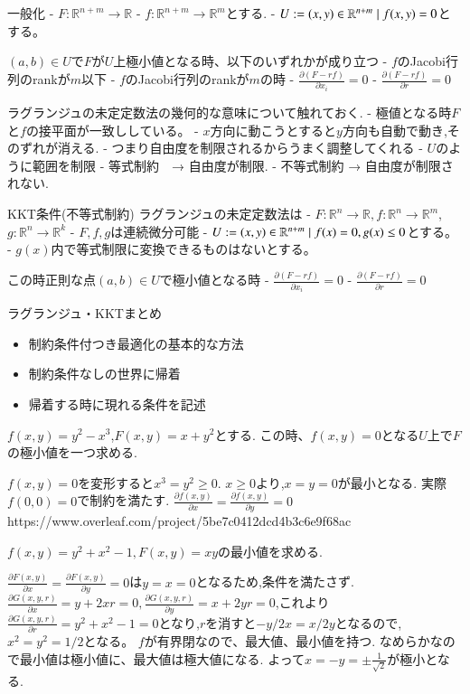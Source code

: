 一般化
- $F: \mathbb{R}^{n+m} \to \mathbb{R}$
- $f: \mathbb{R}^{n+m} \to \mathbb{R}^m$とする.
- $U := \\{ (x,y) \in \mathbb{R}^{n+m} \mid f(x,y) = 0\\}$とする。

$(a, b) \in U$で$F$が$U$上極小値となる時、以下のいずれかが成り立つ
- $f$のJacobi行列のrankが$m$以下
- $f$のJacobi行列のrankが$m$の時
  - $\frac{ \partial (F - r f)}{\partial x_i} = 0$
  - $\frac{ \partial (F - r f)}{\partial r} = 0$

ラグランジュの未定定数法の幾何的な意味について触れておく.
- 極値となる時$F$と$f$の接平面が一致ししている。
- $x$方向に動こうとすると$y$方向も自動で動き,そのずれが消える.
- つまり自由度を制限されるからうまく調整してくれる
- $U$のように範囲を制限
  - 等式制約　→ 自由度が制限.
  - 不等式制約 → 自由度が制限されない.

KKT条件(不等式制約)
ラグランジュの未定定数法は
- $F: \mathbb{R}^{n} \to \mathbb{R}, f: \mathbb{R}^{n} \to \mathbb{R}^m$, $g: \mathbb{R}^{n} \to \mathbb{R}^k$
- $F,f, g$は連続微分可能
- $U := \\{(x,y) \in \mathbb{R}^{n+m} \mid f(x) = 0, g(x) \le 0\\}$とする。
- $g(x)$内で等式制限に変換できるものはないとする。

この時正則な点$(a,b) \in U$で極小値となる時
  - $\frac{ \partial (F - r f)}{\partial x_i} = 0$
  - $\frac{ \partial (F - r f)}{\partial r} = 0$

\begin{rem}
ラグランジュ・KKTまとめ
\begin{itemize}
\item 制約条件付つき最適化の基本的な方法
\item 制約条件なしの世界に帰着
\item 帰着する時に現れる条件を記述
\end{itemize}
\end{rem}

\begin{epl}
$f(x, y) = y^2 - x^3$,$F(x, y) = x + y^2$とする.
この時、$f(x, y) = 0$となる$U$上で$F$の極小値を一つ求める.
\end{epl}

$f(x, y)  = 0$を変形すると$x^3 = y^2 \ge 0$.
$x \ge 0$より,$x = y =0$が最小となる.
実際$f(0, 0) = 0$で制約を満たす.
$\frac{\partial f(x, y)}{\partial x} = \frac{\partial f(x, y)}{\partial y} = 0$
https://www.overleaf.com/project/5be7c0412dcd4b3c6e9f68ac
\begin{epl}
$f(x, y) = y^2 + x^2 - 1, F(x, y) = xy$の最小値を求める.
\end{epl}
$\frac{\partial F(x, y)}{\partial x} = \frac{\partial F(x, y)}{\partial y} = 0$は$y = x =0$となるため,条件を満たさず.
$\frac{\partial G(x, y, r)}{\partial x} = y + 2xr = 0, \frac{\partial G(x, y, r)}{\partial y} = x + 2yr = 0$,これより$\frac{\partial G(x, y, r)}{\partial r} = y^2 + x^2 - 1 = 0$となり,$r$を消すと$- y /2x = x/ 2y$となるので,$x^2 = y^2 = 1/2$となる。
$f$が有界閉なので、最大値、最小値を持つ.
なめらかなので最小値は極小値に、最大値は極大値になる.
よって$x = - y = \pm \frac{1}{\sqrt{2}}$が極小となる.
